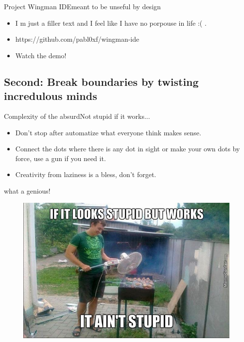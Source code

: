 \begin{frame}{Project Wingman IDE}{meant to be unseful by design}

  \begin{itemize}
  \item
    I m just a filler text and I feel like I have no porpouse in life :( . \newline 
 \item
   https://github.com/pabl0xf/wingman-ide
  \item
 \pause
    Watch the demo!\newline 
  \end{itemize}
\end{frame}

\subsection{Second: Break boundaries by twisting incredulous minds}


\begin{frame}{Complexity of the absurd}{Not stupid if it works...}

\begin{itemize}
  \item
    Don't stop after \alert{automatize}  what everyone think makes sense.
  \pause
  \item
    Connect the dots where there is any dot in sight or make your own dots by force, use a gun if you need it. 
  \pause
\item
    Creativity from laziness is a bless, don't forget.
  \end{itemize}
\end{frame}

\begin{frame}{what a genious!}{ }

\begin{figure}[h]
\centering
\includegraphics[scale=0.50]{../images/stupid1.jpg}
\end{figure}
 
\end{frame}

